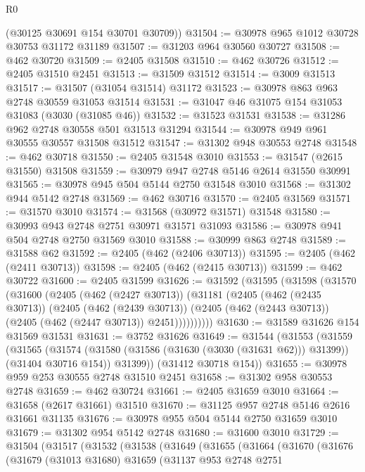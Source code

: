 \begin{lexlean}{R0}
\begin{coremodule}
      (@30125 @30691 @154 @30701 @30709))
@31504 := @30978 @965 @1012 @30728 @30753 @31172 @31189
@31507 := @31203 @964 @30560 @30727
@31508 := @462 @30720
@31509 := @2405 @31508
@31510 := @462 @30726
@31512 := @2405 @31510 @2451
@31513 := @31509 @31512
@31514 := @3009 @31513
@31517 := @31507 (@31054 @31514) @31172
@31523 := @30978 @863 @963 @2748 @30559 @31053 @31514
@31531 := @31047 @46 @31075 @154 @31053 @31083 (@3030 (@31085 @46))
@31532 := @31523 @31531
@31538 := @31286 @962 @2748 @30558 @501 @31513 @31294
@31544 := @30978 @949 @961 @30555 @30557 @31508 @31512
@31547 := @31302 @948 @30553 @2748
@31548 := @462 @30718
@31550 := @2405 @31548 @3010
@31553 := @31547 (@2615 @31550) @31508
@31559 := @30979 @947 @2748 @5146 @2614 @31550 @30991
@31565 := @30978 @945 @504 @5144 @2750 @31548 @3010
@31568 := @31302 @944 @5142 @2748
@31569 := @462 @30716
@31570 := @2405 @31569
@31571 := @31570 @3010
@31574 := @31568 (@30972 @31571) @31548
@31580 := @30993 @943 @2748 @2751 @30971 @31571 @31093
@31586 := @30978 @941 @504 @2748 @2750 @31569 @3010
@31588 := @30999 @863 @2748
@31589 := @31588 @62
@31592 := @2405 (@462 (@2406 @30713))
@31595 := @2405 (@462 (@2411 @30713))
@31598 := @2405 (@462 (@2415 @30713))
@31599 := @462 @30722
@31600 := @2405 @31599
@31626 := @31592
    (@31595
      (@31598
        (@31570
          (@31600
            (@2405
              (@462 (@2427 @30713))
              (@31181
                (@2405
                  (@462 (@2435 @30713))
                  (@2405
                    (@462 (@2439 @30713))
                    (@2405 (@462 (@2443 @30713)) (@2405 (@462 (@2447 @30713)) @2451))))))))))
@31630 := @31589 @31626 @154 @31569 @31531
@31631 := @3752 @31626
@31649 := @31544
    (@31553
      (@31559
        (@31565
          (@31574 (@31580 (@31586 (@31630 (@3030 (@31631 @62))) @31399)) (@31404 @30716 @154))
          @31399))
      (@31412 @30718 @154))
@31655 := @30978 @959 @253 @30555 @2748 @31510 @2451
@31658 := @31302 @958 @30553 @2748
@31659 := @462 @30724
@31661 := @2405 @31659 @3010
@31664 := @31658 (@2617 @31661) @31510
@31670 := @31125 @957 @2748 @5146 @2616 @31661 @31135
@31676 := @30978 @955 @504 @5144 @2750 @31659 @3010
@31679 := @31302 @954 @5142 @2748
@31680 := @31600 @3010
@31729 := @31504
    (@31517
      (@31532
        (@31538
          (@31649
            (@31655
              (@31664
                (@31670
                  (@31676
                    (@31679
                      (@31013 @31680)
                      @31659
                      (@31137
                        @953
                        @2748
                        @2751

\end{coremodule}
\end{lexlean}
